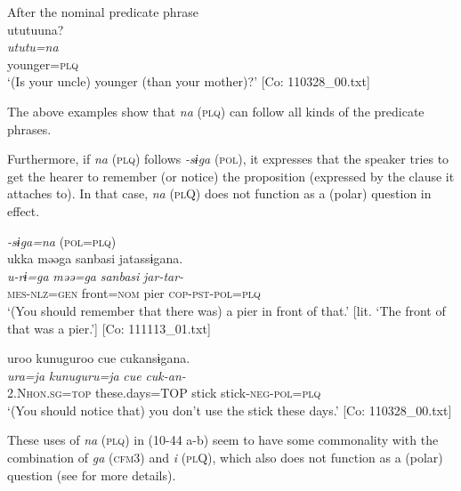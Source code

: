   \ex After the nominal predicate phrase\\
      \glll    ututuuna?\\
    \textit{ututu}\footnotemark\textit{=na}\\
    younger=\textsc{plq}\\
  \glt     ‘(Is your uncle) younger (than your mother)?’  [Co: 110328\_00.txt]
  \z
\z{}

The above examples show that \textit{na} (\textsc{plq}) can follow all kinds of the predicate phrases.

  Furthermore, if \textit{na} (\textsc{plq}) follows \textit{-sɨga} (\textsc{pol}), it expresses that the speaker tries to get the hearer to remember (or notice) the proposition (expressed by the clause it attaches to). In that case, \textit{na} (\textsc{pl}Q) does not function as a (polar) question in effect.

\ea\label{ex:10.44}   \textit{{}-sɨga=na} (\textsc{pol}=\textsc{plq})\\
  \ea  %
      \glll    ukka  məəga  sanbasi  jatassɨgana.\\
      \textit{u-rɨ=ga}  \textit{məə=ga}  \textit{sanbasi}  \textit{jar-tar-}\\
      \textsc{mes}-\textsc{nlz}=\textsc{gen}  front=\textsc{nom}  pier  \textsc{cop}-\textsc{pst}-\textsc{pol}=\textsc{plq}\\
      \glt       ‘(You should remember that there was) a pier in front of that.’ [lit. ‘The front of that was a pier.’] [Co: 111113\_01.txt]

  \ex  %
      \glll    uroo  kunuguroo  {\textbar}cue{\textbar}  cukansɨgana.\\
      \textit{ura=ja}  \textit{kunuguru=ja}  \textit{cue}  \textit{cuk-an-}\\
      2.N\textsc{hon}.\textsc{sg}=\textsc{top}  these.days=TOP  stick  stick-\textsc{neg}-\textsc{pol}=\textsc{plq}\\
      \glt       ‘(You should notice that) you don’t use the stick these days.’ [Co: 110328\_00.txt]
    \z
\z

These uses of \textit{na} (\textsc{plq}) in (10-44 a-b) seem to have some commonality with the combination of \textit{ga} (\textsc{cfm}3) and \textit{i} (\textsc{pl}Q), which also does not function as a (polar) question (see  for more details).

